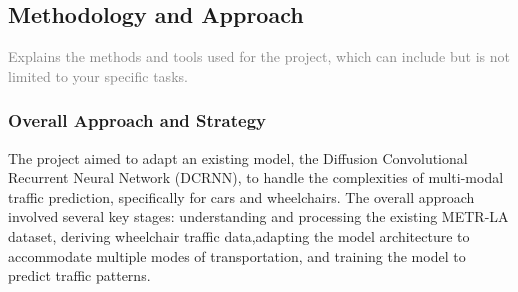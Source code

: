 \subsection{Methodology and Approach}\label{subsec:methodology-and-approach}
\textcolor{gray}
{Explains the methods and tools used for the project, which can include but is not limited to your specific tasks.
}

\subsubsection{Overall Approach and Strategy}\label{subsubsec:overall-approach-and-strategy}
The project aimed to adapt an existing model, the Diffusion Convolutional Recurrent Neural Network (DCRNN), to handle
the complexities of multi-modal traffic prediction, specifically for cars and wheelchairs.
The overall approach involved several key stages: understanding and processing the existing METR-LA dataset, deriving
wheelchair traffic data,adapting the model architecture to accommodate multiple modes of transportation, and training
the model to predict traffic patterns.


